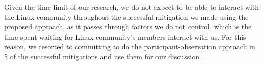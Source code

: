 Given the time limit of our research, we do not expect to be able to interact with the Linux 
community throughout the successful mitigation we made using the proposed approach, as it passes 
through factors we do not control, which is the time spent waiting for Linux community’s members 
interact with us. For this reason, we resorted to committing to do the participant-observation 
approach in 5 of the successful mitigations and use them for our discussion.
